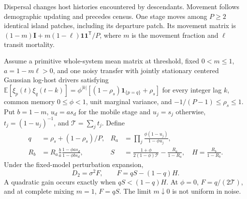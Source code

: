 Dispersal changes host histories encountered by descendants. Movement follows demographic updating and precedes census. One stage moves among \(P\geq2\) identical island patches, including its departure patch. Its movement matrix is \((1-m)\mathbf I+m(1-\ell)\mathbf1\mathbf1^{\mathsf T}/P\), where \(m\) is the movement fraction and \(\ell\) transit mortality.

\begin{proposition}\label{prop:mech-dispersal}
Assume a primitive whole-system mean matrix at threshold, fixed \(0<m\leq1\), \(a=1-m\ell>0\), and one noisy transfer with jointly stationary centered Gaussian log-host drivers satisfying \(\mathbb E[\xi_p(t)\xi_q(t-k)]=\phi^{|k|}[(1-\rho_s)\mathbf1_{\{p=q\}}+\rho_s]\) for every integer lag \(k\), common memory \(0\leq\phi<1\), unit marginal variance, and \(-1/(P-1)\leq\rho_s\leq1\). Put \(b=1-m\), \(u_d=as_d\) for the mobile stage and \(u_j=s_j\) otherwise, \(t_j=(1-u_j)^{-1}\), and \(\mathcal T=\sum_jt_j\). Define
\begin{align}
 q&=\rho_s+(1-\rho_s)/P,&
 R_a&=\prod_j\frac{\phi(1-u_j)}{1-\phi u_j},\label{eq:mech-spatial-return}\\
 R_b&=R_a\frac ba\frac{1-\phi as_d}{1-\phi bs_d},&
 S&=\frac{1+\phi}{2(1-\phi)\mathcal T}-\frac{R_a}{1-R_a},\quad H=\frac{R_b}{1-R_b}.\nonumber
\end{align}
Under the fixed-model perturbation expansion,
\begin{equation}\label{eq:mech-dispersal}
 D_2=\sigma^2F,\qquad F=qS-(1-q)H.
\end{equation}
A quadratic gain occurs exactly when \(qS<(1-q)H\). At \(\phi=0\), \(F=q/(2\mathcal T)\), and at complete mixing \(m=1\), \(F=qS\). The limit \(m\downarrow0\) is not uniform in noise.
\end{proposition}

